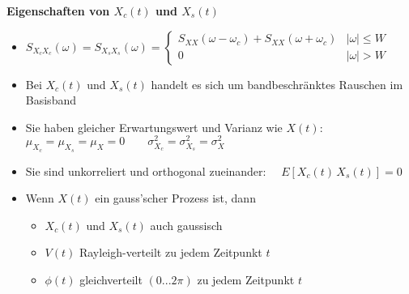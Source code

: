 				\textbf{Eigenschaften von $X_c(t)$ und $X_s(t)$}\\[-0.5cm]
				\begin{itemize}
					\item $S_{X_cX_c}(\omega) = S_{X_sX_s}(\omega) = \begin{cases}S_{XX}(\omega-\omega_c) + S_{XX}(\omega + \omega_c) & |\omega|\leq W\\ 0 & |\omega|> W\end{cases}$\\[-0.3cm]
					\item Bei $X_c(t)$ und $X_s(t)$ handelt es sich um bandbeschränktes Rauschen im Basisband\\[-0.6cm]
					\item Sie haben gleicher Erwartungswert und Varianz wie $X(t)$:$\quad$
						$\mu_{X_c} = \mu_{X_s} = \mu_{X} = 0\qquad \sigma_{X_c}^2 = \sigma_{X_s}^2 = \sigma_{X}^2$\\[-0.6cm]
					\item Sie sind unkorreliert und orthogonal zueinander: $\quad E[X_c(t)\,X_s(t)] = 0$\\[-0.6cm]
					\item Wenn $X(t)$ ein gauss'scher Prozess ist, dann\\[-0.65cm]
					\begin{itemize}
						\item $X_c(t)$ und $X_s(t)$ auch gaussisch\\[-0.65cm]
						\item $V(t)$ Rayleigh-verteilt zu jedem Zeitpunkt $t$\\[-0.65cm]
						\item $\phi(t)$ gleichverteilt $(0...2\pi)$ zu jedem Zeitpunkt $t$
					\end{itemize}
				\end{itemize}

